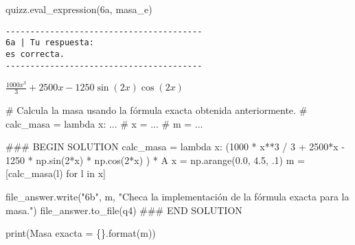 \documentclass[
  letterpaper,
  DIV=11,
  numbers=noendperiod]{scrreprt}
\newenvironment{Shaded}{\begin{snugshade}}{\end{snugshade}}
\newcommand{\BuiltInTok}[1]{\textcolor[rgb]{0.00,0.23,0.31}{#1}}
\newcommand{\CommentTok}[1]{\textcolor[rgb]{0.37,0.37,0.37}{#1}}
\newcommand{\ControlFlowTok}[1]{\textcolor[rgb]{0.00,0.23,0.31}{#1}}
\newcommand{\DecValTok}[1]{\textcolor[rgb]{0.68,0.00,0.00}{#1}}
\newcommand{\FloatTok}[1]{\textcolor[rgb]{0.68,0.00,0.00}{#1}}
\newcommand{\KeywordTok}[1]{\textcolor[rgb]{0.00,0.23,0.31}{#1}}
\newcommand{\NormalTok}[1]{\textcolor[rgb]{0.00,0.23,0.31}{#1}}
\newcommand{\OperatorTok}[1]{\textcolor[rgb]{0.37,0.37,0.37}{#1}}
\newcommand{\RegionMarkerTok}[1]{\textcolor[rgb]{0.00,0.23,0.31}{#1}}
\newcommand{\SpecialCharTok}[1]{\textcolor[rgb]{0.37,0.37,0.37}{#1}}
\newcommand{\StringTok}[1]{\textcolor[rgb]{0.13,0.47,0.30}{#1}}
\begin{document}
\begin{Shaded}
\begin{Highlighting}[]
\NormalTok{quizz.eval\_expression(}\StringTok{\textquotesingle{}6a\textquotesingle{}}\NormalTok{, masa\_e)}
\end{Highlighting}
\end{Shaded}

\begin{verbatim}
----------------------------------------
6a | Tu respuesta:
es correcta.
----------------------------------------
\end{verbatim}

$\displaystyle \frac{1000 x^{3}}{3} + 2500 x - 1250 \sin{\left(2 x \right)} \cos{\left(2 x \right)}$

\begin{Shaded}
\begin{Highlighting}[]
\CommentTok{\# Calcula la masa usando la fórmula exacta obtenida anteriormente.}
\CommentTok{\# calc\_masa = lambda x: ...}
\CommentTok{\# x = ...}
\CommentTok{\# m = ...}

\CommentTok{\#\#\# }\RegionMarkerTok{BEGIN}\CommentTok{ SOLUTION}
\NormalTok{calc\_masa }\OperatorTok{=} \KeywordTok{lambda}\NormalTok{ x: (}\DecValTok{1000} \OperatorTok{*}\NormalTok{ x}\OperatorTok{**}\DecValTok{3} \OperatorTok{/} \DecValTok{3} \OperatorTok{+} \DecValTok{2500}\OperatorTok{*}\NormalTok{x }\OperatorTok{{-}} \DecValTok{1250} \OperatorTok{*}\NormalTok{ np.sin(}\DecValTok{2}\OperatorTok{*}\NormalTok{x) }\OperatorTok{*}\NormalTok{ np.cos(}\DecValTok{2}\OperatorTok{*}\NormalTok{x) ) }\OperatorTok{*}\NormalTok{ A}
\NormalTok{x }\OperatorTok{=}\NormalTok{ np.arange(}\FloatTok{0.0}\NormalTok{, }\FloatTok{4.5}\NormalTok{, }\FloatTok{.1}\NormalTok{)}
\NormalTok{m }\OperatorTok{=}\NormalTok{ [calc\_masa(l) }\ControlFlowTok{for}\NormalTok{ l }\KeywordTok{in}\NormalTok{ x]}

\NormalTok{file\_answer.write(}\StringTok{"6b"}\NormalTok{, m, }\StringTok{"Checa la implementación de la fórmula exacta para la masa."}\NormalTok{)}
\NormalTok{file\_answer.to\_file(}\StringTok{\textquotesingle{}q4\textquotesingle{}}\NormalTok{)}
\CommentTok{\#\#\# }\RegionMarkerTok{END}\CommentTok{ SOLUTION}

\BuiltInTok{print}\NormalTok{(}\StringTok{\textquotesingle{}Masa exacta = }\SpecialCharTok{\{\}}\StringTok{\textquotesingle{}}\NormalTok{.}\BuiltInTok{format}\NormalTok{(m))}
\end{Highlighting}
\end{Shaded}
\end{document}
